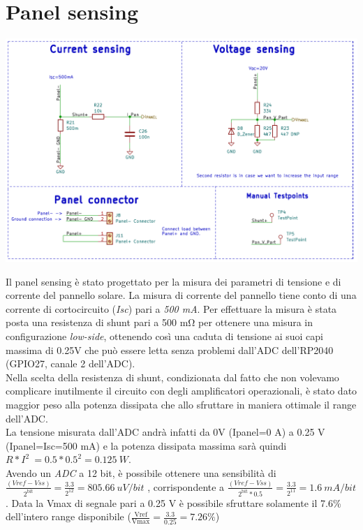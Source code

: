 \hypertarget{panel-sensing}{%
\section{\texorpdfstring{Panel sensing}{ Panel sensing}}\label{panel-sensing}}

\begin{center}
\includegraphics[scale=0.5]{figures/image24.png}
\captionsetup{type=figure}
\end{center}

\noindent Il panel sensing è stato progettato per la misura dei parametri di
tensione e di corrente del pannello solare. La misura di corrente del
pannello tiene conto di una corrente di cortocircuito (\emph{Isc}) pari
a \emph{500 mA}. Per effettuare la misura è stata posta una resistenza
di shunt pari a 500 mΩ per ottenere una misura in configurazione \emph{low-side},
ottenendo così una caduta di tensione ai suoi capi massima di 0.25V che
può essere letta senza problemi dall'ADC dell'RP2040 (GPIO27, canale 2
dell'ADC).\\
Nella scelta della resistenza di shunt, condizionata dal fatto che non
volevamo complicare inutilmente il circuito con degli amplificatori
operazionali, è stato dato maggior peso alla potenza dissipata che allo
sfruttare in maniera ottimale il range dell'ADC.\\
La tensione misurata dall'ADC andrà infatti da 0V (Ipanel=0 A) a 0.25 V
(Ipanel=Isc=500 mA) e la potenza dissipata massima sarà quindi
\(R*I^{2}\  = 0.5*0.5^{2} = 0.125\ W\).\\
Avendo un \emph{ADC} a 12 bit, è possibile ottenere una sensibilità di
\(\frac{(Vref - Vss)}{2^{\text{bit}}} = \frac{3.3}{2^{12}} = 805.66\ uV/bit\)
, corrispondente a
\(\frac{(Vref - Vss)}{2^{\text{bit}}*0.5} = \frac{3.3}{2^{11}} = 1.6\ mA/bit\).
Data la Vmax di segnale pari a 0.25 V è possibile sfruttare solamente il
7.6\% dell'intero range disponibile
(\(\frac{\text{Vref}}{\text{Vmax}} = \frac{3.3}{0.25} = 7.26\%\))

